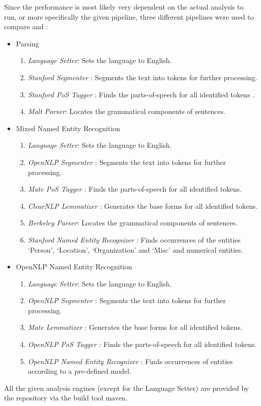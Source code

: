 Since the performance is most likely very dependent on the actual analysis to run, or more specifically the given pipeline, three different pipelines were used to compare \uimaas{} and \spark{}:
\begin{itemize}
	\item{}Parsing
	\begin{enumerate}
		\item{}\emph{Language Setter}: Sets the \cas{} language to English. 
		\item{}\emph{Stanford Segmenter \cite{manning-EtAl:2014:P14-5}}: Segments the text into tokens for further processing.
		\item{}\emph{Stanford PoS Tagger \cite{manning-EtAl:2014:P14-5}}: Finds the parts-of-speech for all identified tokens \cite{toutanova2003feature}.
		\item{}\emph{Malt Parser\cite{Nivre05maltparser:a}}: Locates the grammatical components of sentences.
	\end{enumerate}
	\item{}Mixed Named Entity Recognition
	\begin{enumerate}
		\item{}\emph{Language Setter}: Sets the \cas{} language to English. 
		\item{}\emph{OpenNLP Segmenter \cite{opennlp}}: Segments the text into tokens for further processing.
		\item{}\emph{Mate PoS Tagger \cite{bohnet2010very}}: Finds the parts-of-speech for all identified tokens.
		\item{}\emph{ClearNLP Lemmatizer \cite{manning-EtAl:2014:P14-5}}: Generates the base forms for all identified tokens.
		\item{}\emph{Berkeley Parser\cite{petrov2006learning,petrov2007improved}}: Locates the grammatical components of sentences.
		\item{}\emph{Stanford Named Entity Recognizer \cite{manning-EtAl:2014:P14-5}}: Finds occurrences of the entities `Person', `Location', `Organization' and `Misc' and numerical entities.
	\end{enumerate}
	\item{}OpenNLP Named Entity Recognition
	\begin{enumerate}
		\item{}\emph{Language Setter}: Sets the \cas{} language to English. 
		\item{}\emph{OpenNLP Segmenter \cite{opennlp}}: Segments the text into tokens for further processing.
		\item{}\emph{Mate Lemmatizer \cite{bohnet2010very}}: Generates the base forms for all identified tokens.
		\item{}\emph{OpenNLP PoS Tagger \cite{opennlp}}: Finds the parts-of-speech for all identified tokens.
		\item{}\emph{OpenNLP Named Entity Recognizer \cite{opennlp}}: Finds occurrences of entities according to a pre-defined model.

	\end{enumerate}
	
\end{itemize}
All the given analysis engines (except for the Language Setter) are provided by the \dkpro{} repository via the build tool maven. 

